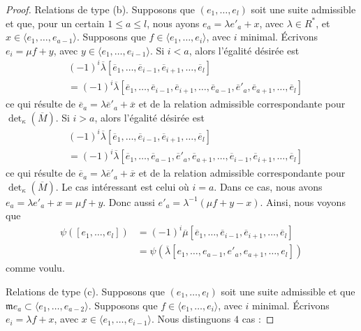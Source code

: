 \begin{proof}
\medskip\noindent
Relations de type (b). Supposons que $(e_1, \ldots, e_l)$ soit une
suite admissible et que, pour un certain $1 \leq a \leq l$, nous ayons
$e_a = \lambda e'_a + x$, avec $\lambda \in R^*$, et
$x \in \langle e_1, \ldots, e_{a - 1}\rangle$.
Supposons que $f \in \langle e_1, \ldots, e_i\rangle$, avec $i$ minimal.
Écrivons $e_i = \mu f + y$, avec $y \in \langle e_1, \ldots, e_{i - 1}\rangle$.
Si $i < a$, alors l'égalité désirée est
$$
\begin{aligned}
&
(-1)^i
\overline{\lambda}
[\overline{e}_1,
\ldots,
\overline{e}_{i - 1},
\overline{e}_{i + 1},
\ldots,
\overline{e}_l] \\
&=
(-1)^i
\overline{\lambda}
[\overline{e}_1,
\ldots,
\overline{e}_{i - 1},
\overline{e}_{i + 1},
\ldots,
\overline{e}_{a - 1},
\overline{e}'_a,
\overline{e}_{a + 1},
\ldots,
\overline{e}_l]
\end{aligned}
$$
ce qui résulte de $\overline{e}_a = \lambda \overline{e}'_a + \overline{x}$
et de la relation admissible correspondante pour $\det_\kappa(\overline{M})$.
Si $i > a$, alors l'égalité désirée est
$$
\begin{aligned}
&
(-1)^i
\overline{\lambda}
[\overline{e}_1,
\ldots,
\overline{e}_{i - 1},
\overline{e}_{i + 1},
\ldots,
\overline{e}_l] \\
&=
(-1)^i
\overline{\lambda}
[\overline{e}_1,
\ldots,
\overline{e}_{a - 1},
\overline{e}'_a,
\overline{e}_{a + 1},
\ldots,
\overline{e}_{i - 1},
\overline{e}_{i + 1},
\ldots,
\overline{e}_l]
\end{aligned}
$$
ce qui résulte de $\overline{e}_a = \lambda \overline{e}'_a + \overline{x}$
et de la relation admissible correspondante pour $\det_\kappa(\overline{M})$.
Le cas intéressant est celui où $i = a$. Dans ce cas, nous avons
$e_a = \lambda e'_a + x = \mu f + y$. Donc aussi
$e'_a = \lambda^{-1}(\mu f + y - x)$. Ainsi, nous voyons que
$$
\begin{aligned}
\psi([e_1, \ldots, e_l])
&= (-1)^i \overline{\mu}
[\overline{e}_1, \ldots,
\overline{e}_{i - 1},
\overline{e}_{i + 1}, \ldots, \overline{e}_l] \\
&=
\psi(
\overline{\lambda}
[e_1, \ldots, e_{a - 1}, e'_a, e_{a + 1}, \ldots, e_l]
)
\end{aligned}
$$
comme voulu.

\medskip\noindent
Relations de type (c). Supposons que $(e_1, \ldots, e_l)$
soit une suite admissible et que
$\mathfrak m e_a \subset \langle e_1, \ldots, e_{a - 2}\rangle$.
Supposons que $f \in \langle e_1, \ldots, e_i\rangle$, avec $i$ minimal.
Écrivons $e_i = \lambda f + x$, avec $x \in \langle e_1, \ldots, e_{i - 1}\rangle$.
Nous distinguons $4$ cas :


\end{proof}
